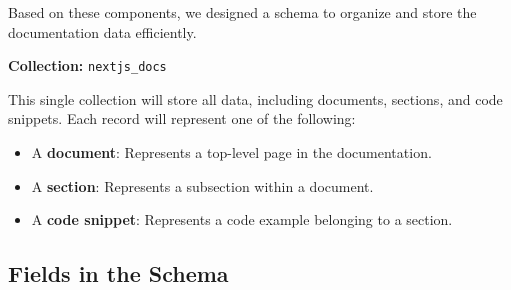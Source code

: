 
Based on these components, we designed a schema to organize and store the documentation data efficiently.

\textbf{Collection:} \texttt{nextjs\_docs}

This single collection will store all data, including documents, sections, and code snippets. Each record will represent one of the following:
\begin{itemize}
	\item A \textbf{document}: Represents a top-level page in the documentation.
	\item A \textbf{section}: Represents a subsection within a document.
	\item A \textbf{code snippet}: Represents a code example belonging to a section.
\end{itemize}

\subsection{Fields in the Schema}

